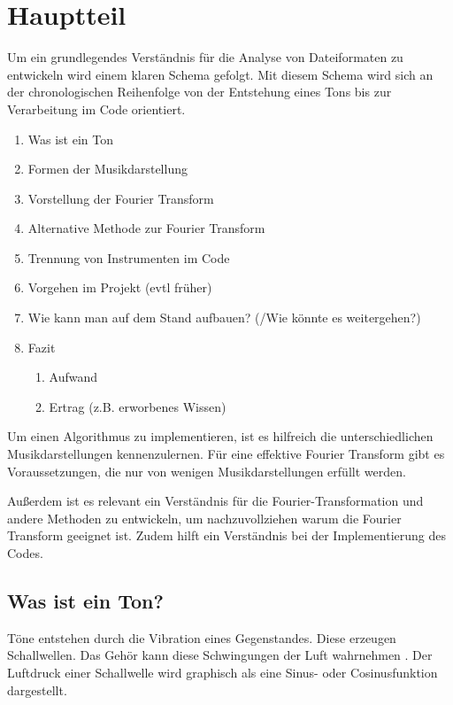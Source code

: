 \chapter{Hauptteil}
%


Um ein grundlegendes Verständnis für die Analyse von Dateiformaten zu entwickeln wird einem klaren Schema gefolgt. Mit diesem Schema wird sich an der chronologischen Reihenfolge von der Entstehung eines Tons bis zur Verarbeitung im Code orientiert.

%
\begin{enumerate}
    \item Was ist ein Ton
    \item Formen der Musikdarstellung
    \item Vorstellung der Fourier Transform
    \item Alternative Methode zur Fourier Transform
    \item Trennung von Instrumenten im Code
    \item Vorgehen im Projekt (evtl früher)
    \item Wie kann man auf dem Stand aufbauen? (/Wie könnte es weitergehen?)
    \item Fazit
    \begin{enumerate}
        \item Aufwand
        \item Ertrag (z.B. erworbenes Wissen)
    \end{enumerate}
\end{enumerate}
%

Um einen Algorithmus zu implementieren, ist es hilfreich die unterschiedlichen Musikdarstellungen kennenzulernen. Für eine effektive Fourier Transform gibt es Voraussetzungen, die nur von wenigen Musikdarstellungen erfüllt werden.

\par

Außerdem ist es relevant ein Verständnis für die Fourier-Transformation und andere Methoden zu entwickeln, um nachzuvollziehen warum die Fourier Transform geeignet ist. Zudem hilft ein Verständnis bei der Implementierung des Codes.

%
\section{Was ist ein Ton?}
\label{sounds}
%

Töne entstehen durch die Vibration eines Gegenstandes. Diese erzeugen Schallwellen. Das Gehör kann diese Schwingungen der Luft wahrnehmen \parencite{signaltoene}. Der Luftdruck einer Schallwelle wird graphisch als eine Sinus- oder Cosinusfunktion dargestellt.


